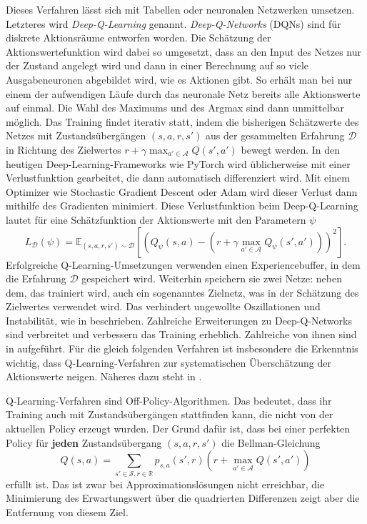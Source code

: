 Dieses Verfahren lässt sich mit Tabellen oder neuronalen Netzwerken umsetzen.
Letzteres wird \textit{Deep-Q-Learning} genannt.
\textit{Deep-Q-Networks} (DQNs) sind für diskrete Aktionsräume entworfen worden.
Die Schätzung der Aktionswertefunktion wird dabei so umgesetzt, dass an den Input des Netzes nur der Zustand angelegt wird und dann in einer Berechnung auf so viele Ausgabeneuronen abgebildet wird, wie es Aktionen gibt.
So erhält man bei nur einem der aufwendigen Läufe durch das neuronale Netz bereits alle Aktionswerte auf einmal.
Die Wahl des Maximums und des Argmax sind dann unmittelbar möglich.
Das Training findet iterativ statt, indem die bisherigen Schätzwerte des Netzes mit Zustandsübergängen $(s, a, r, s')$ aus der gesammelten Erfahrung $\mathcal{D}$ in Richtung des Zielwertes $r+\gamma \max_{a'\in\mathcal{A}}{Q(s',a')}$ bewegt werden.
In den heutigen Deep-Learning-Frameworks wie PyTorch \cite{NEURIPS2019_9015} wird üblicherweise mit einer Verlustfunktion gearbeitet, die dann automatisch differenziert wird.
Mit einem Optimizer wie Stochastic Gradient Descent oder Adam \cite{adam2014} wird dieser Verlust dann mithilfe des Gradienten minimiert.
Diese Verlustfunktion beim Deep-Q-Learning lautet für eine Schätzfunktion der Aktionswerte mit den Parametern $\psi$
\begin{equation}
	L_\mathcal{D}(\psi) = \mathbb{E}_{(s, a, r, s')\sim\mathcal{D}}\left[\left(Q_\psi(s,a)-\left(r+\gamma \max_{a'\in\mathcal{A}}{Q_\psi(s',a')}\right)\right)^2\right].
\end{equation}
Erfolgreiche Q-Learning-Umsetzungen verwenden einen Experiencebuffer, in dem die Erfahrung $\mathcal{D}$ gespeichert wird.
Weiterhin speichern sie zwei Netze: neben dem, das trainiert wird, auch ein sogenanntes Zielnetz, was in der Schätzung des Zielwertes verwendet wird.
Das verhindert ungewollte Oszillationen und Instabilität, wie in \cite{atari2014} beschrieben.
Zahlreiche Erweiterungen zu Deep-Q-Networks sind verbreitet und verbessern das Training erheblich.
Zahlreiche von ihnen sind in \cite{qlearningcomparison2017} aufgeführt.
Für die gleich folgenden Verfahren ist insbesondere die Erkenntnis wichtig, dass Q-Learning-Verfahren zur systematischen Überschätzung der Aktionswerte neigen.
Näheres dazu steht in \cite{qlearningoverestimation}.

Q-Learning-Verfahren sind Off-Policy-Algorithmen.
Das bedeutet, dass ihr Training auch mit Zustandsübergängen stattfinden kann, die nicht von der aktuellen Policy erzeugt wurden.
Der Grund dafür ist, dass bei einer perfekten Policy für \textbf{jeden} Zustandsübergang $(s, a, r, s')$ die Bellman-Gleichung
\begin{equation}
	Q(s, a) = \sum_{s'\in\mathcal{S}, r \in \mathbb{R}}{p_{s, a}\left(s', r\right) \left(r + \max_{a' \in \mathcal{A}}{Q(s', a')}\right)}
\end{equation}
erfüllt ist.
Das ist zwar bei Approximationslösungen nicht erreichbar, die Minimierung des Erwartungswert über die quadrierten Differenzen zeigt aber die Entfernung von diesem Ziel.

